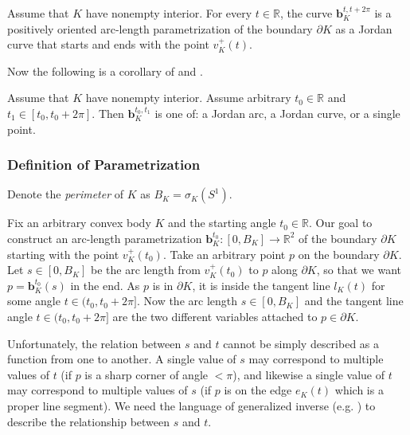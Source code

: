 \begin{theorem}

Assume that \(K\) have nonempty interior. For every \(t \in \mathbb{R}\), the curve \(\mathbf{b}_K^{t, t + 2\pi}\) is a positively oriented arc-length parametrization of the boundary \(\partial K\) as a Jordan curve that starts and ends with the point \(v_K^+(t)\).

\label{thm:param-positive-jordan}
\end{theorem}

Now the following is a corollary of  and .

\begin{corollary}

Assume that \(K\) have nonempty interior. Assume arbitrary \(t_0 \in \mathbb{R}\) and \(t_1 \in [t_0, t_0 + 2\pi]\). Then \(\mathbf{b}_K^{t_0, t_1}\) is one of: a Jordan arc, a Jordan curve, or a single point.

\label{cor:param-positive-jordan}
\end{corollary}

\subsubsection{Definition of Parametrization}

\begin{definition}

Denote the \emph{perimeter} of \(K\) as \(B_K = \sigma_K\left( S^1 \right)\).

\label{def:convex-body-perimeter}
\end{definition}

Fix an arbitrary convex body \(K\) and the starting angle \(t_0 \in \mathbb{R}\). Our goal to construct an arc-length parametrization \(\mathbf{b}_{K}^{t_0} : [0, B_K] \to \mathbb{R}^2\) of the boundary \(\partial K\) starting with the point \(v_K^+(t_0)\). Take an arbitrary point \(p\) on the boundary \(\partial K\). Let \(s \in [0, B_K]\) be the arc length from \(v_K^+(t_0)\) to \(p\) along \(\partial K\), so that we want \(p = \mathbf{b}_{K}^{t_0}(s)\) in the end. As \(p\) is in \(\partial K\), it is inside the tangent line \(l_K(t)\) for some angle \(t \in (t_0, t_0 + 2\pi]\). Now the arc length \(s \in [0, B_K]\) and the tangent line angle \(t \in (t_0, t_0 + 2\pi]\) are the two different variables attached to \(p \in \partial K\).

Unfortunately, the relation between \(s\) and \(t\) cannot be simply described as a function from one to another. A single value of \(s\) may correspond to multiple values of \(t\) (if \(p\) is a sharp corner of angle \(< \pi\)), and likewise a single value of \(t\) may correspond to multiple values of \(s\) (if \(p\) is on the edge \(e_K(t)\) which is a proper line segment). We need the language of generalized inverse (e.g. \autocite{fortelleStudyGeneralizedInverses}) to describe the relationship between \(s\) and \(t\).


